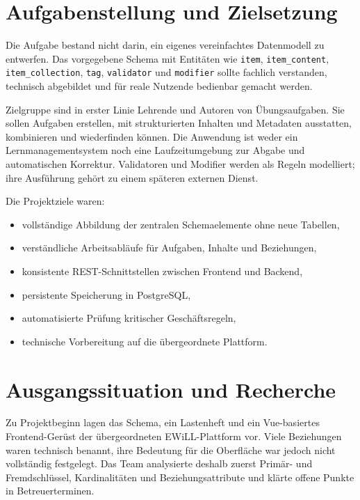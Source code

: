 \documentclass[11pt,a4paper]{article}
\begin{document}
\section{Aufgabenstellung und Zielsetzung}
Die Aufgabe bestand nicht darin, ein eigenes vereinfachtes Datenmodell zu
entwerfen. Das vorgegebene Schema mit Entitäten wie \texttt{item},
\texttt{item\_content}, \texttt{item\_collection}, \texttt{tag},
\texttt{validator} und \texttt{modifier} sollte fachlich verstanden,
technisch abgebildet und für reale Nutzende bedienbar gemacht werden.

Zielgruppe sind in erster Linie Lehrende und Autoren von Übungsaufgaben. Sie
sollen Aufgaben erstellen, mit strukturierten Inhalten und Metadaten
ausstatten, kombinieren und wiederfinden können. Die Anwendung ist weder ein
Lernmanagementsystem noch eine Laufzeitumgebung zur Abgabe und automatischen
Korrektur. Validatoren und Modifier werden als Regeln modelliert; ihre
Ausführung gehört zu einem späteren externen Dienst.

Die Projektziele waren:
\begin{itemize}
\item vollständige Abbildung der zentralen Schemaelemente ohne neue Tabellen,
\item verständliche Arbeitsabläufe für Aufgaben, Inhalte und Beziehungen,
\item konsistente REST-Schnittstellen zwischen Frontend und Backend,
\item persistente Speicherung in PostgreSQL,
\item automatisierte Prüfung kritischer Geschäftsregeln,
\item technische Vorbereitung auf die übergeordnete Plattform.
\end{itemize}

\section{Ausgangssituation und Recherche}
Zu Projektbeginn lagen das Schema, ein Lastenheft und ein Vue-basiertes
Frontend-Gerüst der übergeordneten EWiLL-Plattform vor. Viele Beziehungen
waren technisch benannt, ihre Bedeutung für die Oberfläche war jedoch nicht
vollständig festgelegt. Das Team analysierte deshalb zuerst Primär- und
Fremdschlüssel, Kardinalitäten und Beziehungsattribute und klärte offene
Punkte in Betreuerterminen.
\end{document}
